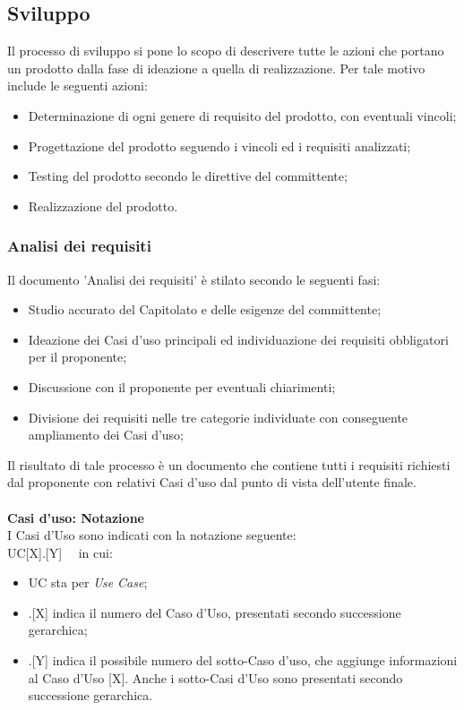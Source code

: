 \documentclass[10pt, a4paper]{article}
\begin{document}
\subsection{Sviluppo}
Il processo di sviluppo si pone lo scopo di descrivere tutte le azioni che portano un prodotto dalla fase di ideazione a quella di realizzazione. Per tale motivo include le seguenti azioni:
\begin{itemize}
    \item Determinazione di ogni genere di requisito del prodotto, con eventuali vincoli;
    \item Progettazione del prodotto seguendo i vincoli ed i requisiti analizzati;
    \item Testing del prodotto secondo le direttive del committente;
    \item Realizzazione del prodotto.
\end{itemize}
\subsubsection{Analisi dei requisiti}
Il documento 'Analisi dei requisiti' è stilato secondo le seguenti fasi:
\begin{itemize}
    \item Studio accurato del Capitolato e delle esigenze del committente;
    \item Ideazione dei Casi d'uso principali ed individuazione dei requisiti obbligatori per il proponente;
    \item Discussione con il proponente per eventuali chiarimenti;
    \item Divisione dei requisiti nelle tre categorie individuate con conseguente ampliamento dei Casi d'uso;
\end{itemize}
Il risultato di tale processo è un documento che contiene
tutti i requisiti richiesti dal proponente con relativi Casi d'uso dal punto di vista dell'utente finale.
\\\\
\textbf{Casi d'uso: Notazione}\\
I Casi d'Uso sono indicati con la notazione seguente: \\ UC[X].[Y] \ \  in cui:
\begin{itemize}
\item UC sta per \textit{Use Case};
\item .[X] indica il numero del Caso d'Uso, presentati secondo successione gerarchica;
\item .[Y] indica il possibile numero del sotto-Caso d'uso, che aggiunge informazioni al Caso d'Uso [X]. Anche i sotto-Casi d'Uso sono presentati secondo successione gerarchica.\\
\end{itemize}
\end{document}
